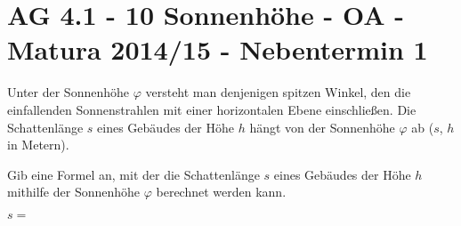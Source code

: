 \section{AG 4.1 - 10 Sonnenhöhe - OA - Matura 2014/15 - Nebentermin 1}

\begin{beispiel}[AG 4.1]{1} %
Unter der Sonnenhöhe $\varphi$ versteht man denjenigen spitzen Winkel, den die einfallenden Sonnenstrahlen mit einer horizontalen Ebene einschließen. Die Schattenlänge $s$ eines Gebäudes der Höhe $h$ hängt von der Sonnenhöhe $\varphi$ ab ($s$, $h$ in Metern). \leer

Gib eine Formel an, mit der die Schattenlänge $s$ eines Gebäudes der Höhe $h$ mithilfe der Sonnenhöhe $\varphi$ berechnet werden kann. \leer

$s=$ 
\end{beispiel}